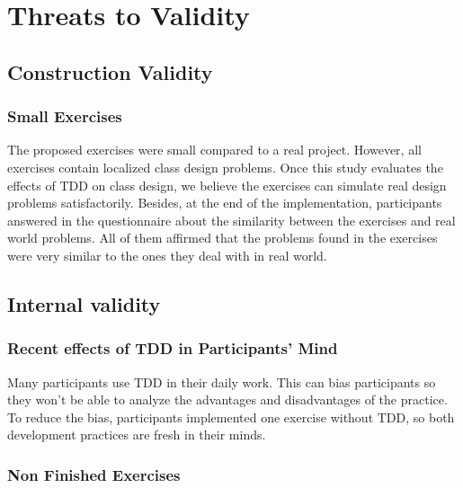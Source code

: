 \documentclass[times]{elsarticle}
\begin{document}
\section{Threats to Validity}
\label{cap:ameacas}

\subsection{Construction Validity}

\subsubsection{Small Exercises}

The proposed exercises were small compared to a real project. However, all exercises
contain localized class design problems. Once this study evaluates the effects
of TDD on class design, we believe the exercises can simulate real design problems
satisfactorily.
Besides, at the end of the implementation, participants answered in the questionnaire about the
similarity between the exercises and real world problems. All of them affirmed that
the problems found in the exercises were very similar to the ones they deal with in real world.

\subsection{Internal validity}

\subsubsection{Recent effects of TDD in Participants' Mind}

Many participants use TDD in their daily work. This can bias participants so they
won't be able to analyze the advantages and disadvantages of the practice.
To reduce the bias, participants implemented one exercise without TDD, so both
development practices are fresh in their minds.

\subsubsection{Non Finished Exercises}
\end{document}

